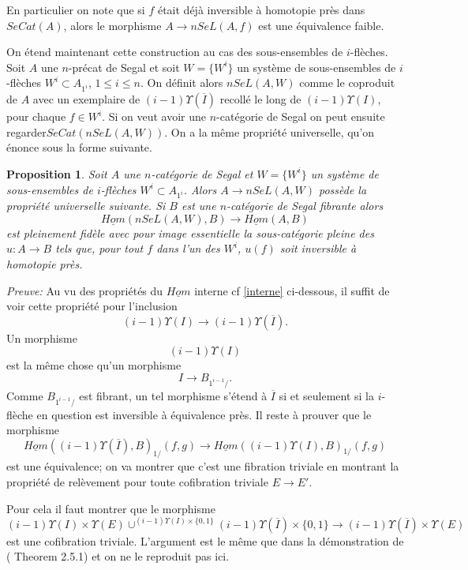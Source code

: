 \documentclass[12pt]{article}
\newtheorem{proposition}[lemma]{Proposition}
\begin{document}
En particulier on note que si $f$ \'etait d\'ej\`a inversible \`a
homotopie pr\`es dans $SeCat(A)$, alors le morphisme
$A\rightarrow nSeL(A, f)$ est une \'equivalence faible.

On \'etend maintenant cette construction au cas des
sous-ensembles de $i$-fl\`eches. Soit $A$ une $n$-pr\'ecat de
Segal et soit $W=\{ W^i \}$ un syst\`eme de sous-ensembles de $i$-fl\`eches
$W^i\subset A_{1^i}$, $1\leq i \leq n$. On d\'efinit alors $nSeL(A,
W)$ comme le coproduit de $A$ avec un exemplaire de $(i-1)\Upsilon
(\overline{I})$ recoll\'e le long de  $(i-1)\Upsilon (I)$,  pour chaque $f\in
W^i$. Si on veut avoir une $n$-cat\'egorie de Segal on peut ensuite
regarder$SeCat(nSeL(A, W))$. On a la m\^eme propri\'et\'e universelle, qu'on
\'enonce sous la forme suivante.

\begin{proposition}
\label{propuniSeL}
Soit $A$ une $n$-cat\'egorie de Segal et
$W=\{ W^i \}$ un syst\`eme de sous-ensembles de $i$-fl\`eches
$W^i\subset A_{1^i}$. Alors $A\rightarrow nSeL(A, W)$ poss\`ede la
propri\'et\'e
universelle suivante. Si $B$ est une
$n$-cat\'egorie de Segal fibrante alors
$$
\underline{Hom}(nSeL(A, W), B)\rightarrow \underline{Hom}(A, B)
$$
est pleinement fid\`ele avec pour image essentielle
la sous-cat\'egorie pleine des $u: A\rightarrow B$ tels que, pour tout
$f$ dans l'un des $W^i$,
$u(f)$ soit inversible
\`a homotopie pr\`es.
\end{proposition}
{\em Preuve:}
Au vu des propri\'et\'es du $\underline{Hom}$ interne cf \ref{interne}
ci-dessous, il suffit de voir cette propri\'et\'e pour l'inclusion
$$
(i-1)\Upsilon (I) \rightarrow (i-1)\Upsilon (\overline{I}).
$$
Un morphisme
$$
(i-1)\Upsilon (I)
$$
est la m\^eme chose qu'un morphisme
$$
I\rightarrow B_{1^{i-1}/}.
$$
Comme $B_{1^{i-1}/}$ est fibrant, un tel morphisme s'\'etend \`a $\overline{I}$
si et seulement si la $i$-fl\`eche en question est inversible \`a \'equivalence
pr\`es. Il reste \`a prouver que le morphisme
$$
\underline{Hom}((i-1)\Upsilon (\overline{I}),B)_{1/}(f,g)
\rightarrow
\underline{Hom}((i-1)\Upsilon (I),B)_{1/}(f,g)
$$
est une \'equivalence; on va montrer que c'est une fibration triviale en
montrant la
propri\'et\'e de rel\`evement pour toute cofibration triviale
$E\rightarrow E'$.

Pour cela il faut montrer que le morphisme
$$
(i-1)\Upsilon (I) \times \Upsilon (E) \cup ^{
(i-1)\Upsilon (I)\times \{ 0,1\}}
(i-1)\Upsilon (\overline{I})\times \{ 0,1\}
\rightarrow
(i-1)\Upsilon (\overline{I})\times \Upsilon (E)
$$
est une cofibration triviale. L'argument est le m\^eme que dans la
d\'emonstration de (\cite{limits} Theorem 2.5.1) et on ne le reproduit pas ici.
\end{document}
